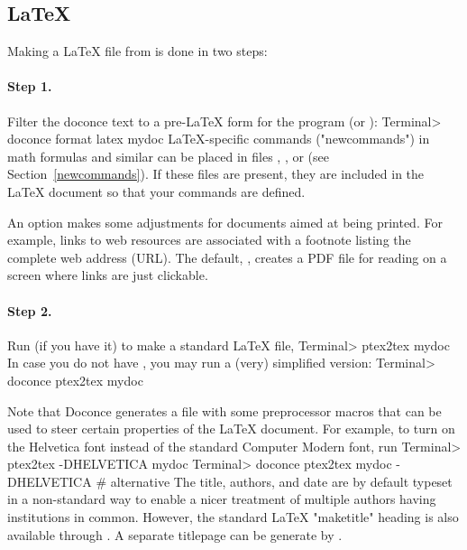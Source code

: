 \documentclass[%
oneside,                 %
final,                   %
10pt]{article}
\begin{document}
\subsection{{\LaTeX}}

Making a {\LaTeX} file  from  is done in two steps:

\paragraph{Step 1.}
Filter the doconce text to a pre-LaTeX form  for
the  program (or ):
\bsys
Terminal> doconce format latex mydoc
\esys
LaTeX-specific commands ("newcommands") in math formulas and similar
can be placed in files , , or
 (see Section~\ref{newcommands}).
If these files are present, they are included in the {\LaTeX} document
so that your commands are defined.

An option  makes some adjustments for documents
aimed at being printed. For example, links to web resources are
associated with a footnote listing the complete web address (URL).
The default, , creates a PDF file for reading
on a screen where links are just clickable.

\paragraph{Step 2.}
Run  (if you have it) to make a standard {\LaTeX} file,
\bsys
Terminal> ptex2tex mydoc
\esys
In case you do not have , you may run a (very) simplified version:
\bsys
Terminal> doconce ptex2tex mydoc
\esys

Note that Doconce generates a  file with some preprocessor macros
that can be used to steer certain properties of the {\LaTeX} document.
For example, to turn on the Helvetica font instead of the standard
Computer Modern font, run
\bsys
Terminal> ptex2tex -DHELVETICA mydoc
Terminal> doconce ptex2tex mydoc -DHELVETICA  # alternative
\esys
The title, authors, and date are by default typeset in a non-standard
way to enable a nicer treatment of multiple authors having
institutions in common. However, the standard {\LaTeX} "maketitle" heading
is also available through .
A separate titlepage can be generate by
.
\end{document}
